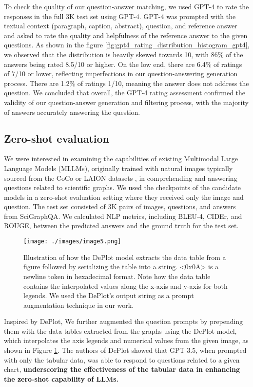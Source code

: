 \documentclass{article}
\begin{document}
To check the quality of our question-answer matching, we used GPT-4 to rate the responses in the full 3K test set using GPT-4. GPT-4 was prompted with the textual context (paragraph, caption, abstract), question, and reference answer and asked to rate the quality and helpfulness of the reference answer to the given questions. As shown in the figure \ref{fig:gpt4_rating_distribution_histogram_gpt4}, we observed that the distribution is heavily skewed towards 10, with 86\% of the answers being rated 8.5/10 or higher. On the low end, there are 6.4\% of ratings of 7/10 or lower, reflecting imperfections in our question-answering generation process. There are 1.2\% of ratings  1/10, meaning the answer does not address the question. We concluded that overall, the GPT-4 rating assessment confirmed the validity of our question-answer generation and filtering process, with the majority of answers accurately answering the question.


\subsection{Zero-shot evaluation}
\label{zero-shot-method}
We were interested in examining the capabilities of existing Multimodal Large Language Models (MLLMs), originally trained with natural images typically sourced from the CoCo or LAION datasets \cite{yin2023survey}, in comprehending and answering questions related to scientific graphs. We used the checkpoints of the candidate models in a zero-shot evaluation setting where they received only the image and question. The test set consisted of 3K pairs of images, questions, and answers from SciGraphQA. We calculated NLP metrics, including BLEU-4, CIDEr, and ROUGE, between the predicted answers and the ground truth for the test set. 

\begin{figure}[!htbp]\label{fig:deplot}
\centering
\texttt{[image: ./images/image5.png]}
\caption{Illustration of how the DePlot model extracts the data table from a figure followed by serializing the table into a string.  \textless{}0x0A\textgreater{} is a newline token in hexadecimal format. Note how the data table contains the interpolated values along the x-axis and y-axis for both legends. We used the DePlot's output string as a prompt augmentation technique in our work.}
\end{figure}

Inspired by DePlot\cite{liu2022deplot}, We further augmented the question prompts by prepending them with the data tables extracted from the graphs using the DePlot model, which interpolates the axis legends and numerical values from the given image, as shown in Figure \ref{fig:deplot}. The authors of DePlot showed that GPT 3.5, when prompted with only the tabular data, was able to respond to questions related to a given chart, {\bf underscoring the effectiveness of the tabular data in enhancing the zero-shot capability of LLMs.}
\end{document}
